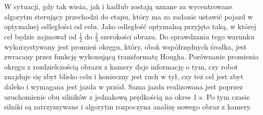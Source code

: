 W sytuacji, gdy tak wieża, jak i kadłub zostają uznane za wycentrowane algorytm sterujący przechodzi do etapu, który ma za zadanie ustawić pojazd w optymalnej odległości od celu. Jako odległość optymalną przyjęto taką, w której cel będzie zajmował od $\frac{1}{2}$ do $\frac{2}{3}$ szerokości obrazu. Do sprawdzania tego warunku wykorzystywany jest promień okręgu, który, obok współrzędnych środka, jest zwracany przez funkcję wykonującą transformatę Hougha. Porównanie promienia okręgu z rozdzielczością obrazu z kamery daje informację o tym, czy robot znajduje się zbyt blisko celu i konieczny jest ruch w tył, czy też cel jest zbyt daleko i wymagana jest jazda w przód. Sama jazda realizowana jest poprzez uruchomienie obu silników z jednakową prędkością na okres 1 s. Po tym czasie silniki są zatrzymywane i algorytm rozpoczyna analizę nowego obraz z kamery.

















    
